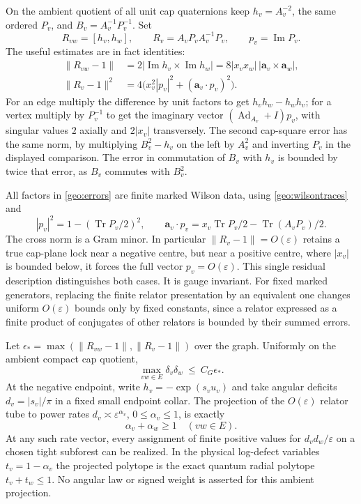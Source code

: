 On the ambient quotient of all unit cap quaternions keep \(h_v=A_v^{-2}\), the same ordered \(P_v\), and \(B_v=A_v^{-1}P_v^{-1}\). Set
\[
 R_{vw}=[h_v,h_w],\qquad R_v=A_vP_vA_v^{-1}P_v,
   \qquad p_v=\operatorname{Im}P_v .
\]
The useful estimates are in fact identities:
\begin{align}
 \|R_{vw}-1\|
   &=2|\operatorname{Im}h_v\times\operatorname{Im}h_w|
     =8|x_vx_w|\,|\mathbf a_v\times\mathbf a_w|,\nonumber\\
 \|R_v-1\|^2
   &=4\bigl(x_v^2|p_v|^2+(\mathbf a_v\cdot p_v)^2\bigr).
 \label{geo:errors}
\end{align}
For an edge multiply the difference by unit factors to get
\(h_vh_w-h_wh_v\); for a vertex multiply by \(P_v^{-1}\) to get the imaginary vector \((\operatorname{Ad}_{A_v}+I)p_v\), with singular values \(2\) axially and \(2|x_v|\) transversely. The second cap-square error has the same norm, by multiplying \(B_v^2-h_v\) on the left by \(A_v^2\) and inverting \(P_v\) in the displayed comparison. The error in commutation of \(B_v\) with \(h_v\) is bounded by twice that error, as \(B_v\) commutes with \(B_v^2\).

All factors in \eqref{geo:errors} are finite marked Wilson data, using \eqref{geo:wilsontraces} and
\[
 |p_v|^2=1-(\operatorname{Tr}P_v/2)^2,\qquad
 \mathbf a_v\cdot p_v=x_v\operatorname{Tr}P_v/2-\operatorname{Tr}(A_vP_v)/2.
\]
The cross norm is a Gram minor. In particular \(\|R_v-1\|=O(\varepsilon)\) retains a true cap-plane lock near a negative centre, but near a positive centre, where \(|x_v|\) is bounded below, it forces the full vector \(p_v=O(\varepsilon)\). This single residual description distinguishes both cases. It is gauge invariant. For fixed marked generators, replacing the finite relator presentation by an equivalent one changes uniform \(O(\varepsilon)\) bounds only by fixed constants, since a relator expressed as a finite product of conjugates of other relators is bounded by their summed errors.

\begin{theorem}\label{geo:ambient}
Let \(\epsilon_*=\max(\|R_{vw}-1\|,\|R_v-1\|)\) over the graph. Uniformly on the ambient compact cap quotient,
\begin{equation}
          \max_{vw\in E}\delta_v\delta_w\ \leq\ C_G\epsilon_*.
 \label{geo:globalproduct}
\end{equation}
At the negative endpoint, write \(h_v=-\exp(s_v u_v)\) and take angular deficits \(d_v=|s_v|/\pi\) in a fixed small endpoint collar. The projection of the \(O(\varepsilon)\) relator tube to power rates \(d_v\asymp\varepsilon^{\alpha_v}\), \(0\leq\alpha_v\leq1\), is exactly
\begin{equation}
                         \alpha_v+\alpha_w\geq1\quad(vw\in E).
 \label{geo:rates}
\end{equation}
At any such rate vector, every assignment of finite positive values for \(d_vd_w/\varepsilon\) on a chosen tight subforest can be realized. In the physical log-defect variables \(t_v=1-\alpha_v\) the projected polytope is the exact quantum radial polytope \(t_v+t_w\leq1\). No angular law or signed weight is asserted for this ambient projection.
\end{theorem}

